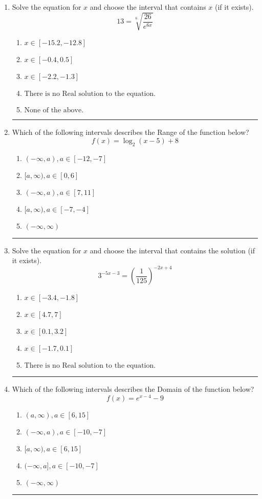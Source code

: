 \documentclass[14pt]{extbook}
\newcommand{\litem}[1]{\item#1\hspace*{-1cm}\rule{\textwidth}{0.4pt}}
\begin{document}
\begin{enumerate}
\litem{
 Solve the equation for $x$ and choose the interval that contains $x$ (if it exists).\[  13 = \sqrt[6]{\frac{26}{e^{6x}}} \]\begin{enumerate}[label=\Alph*.]
\item \( x \in [-15.2, -12.8] \)
\item \( x \in [-0.4, 0.5] \)
\item \( x \in [-2.2, -1.3] \)
\item \( \text{There is no Real solution to the equation.} \)
\item \( \text{None of the above.} \)

\end{enumerate} }
\litem{
Which of the following intervals describes the Range of the function below?\[ f(x) = \log_2{(x-5)}+8 \]\begin{enumerate}[label=\Alph*.]
\item \( (-\infty, a), a \in [-12, -7] \)
\item \( [a, \infty), a \in [0, 6] \)
\item \( (-\infty, a), a \in [7, 11] \)
\item \( [a, \infty), a \in [-7, -4] \)
\item \( (-\infty, \infty) \)

\end{enumerate} }
\litem{
Solve the equation for $x$ and choose the interval that contains the solution (if it exists).\[ 3^{-5x-3} = \left(\frac{1}{125}\right)^{-2x+4} \]\begin{enumerate}[label=\Alph*.]
\item \( x \in [-3.4, -1.8] \)
\item \( x \in [4.7, 7] \)
\item \( x \in [0.1, 3.2] \)
\item \( x \in [-1.7, 0.1] \)
\item \( \text{There is no Real solution to the equation.} \)

\end{enumerate} }
\litem{
Which of the following intervals describes the Domain of the function below?\[ f(x) = e^{x-4}-9 \]\begin{enumerate}[label=\Alph*.]
\item \( (a, \infty), a \in [6, 15] \)
\item \( (-\infty, a), a \in [-10, -7] \)
\item \( [a, \infty), a \in [6, 15] \)
\item \( (-\infty, a], a \in [-10, -7] \)
\item \( (-\infty, \infty) \)


\end{enumerate}}
\end{enumerate}
\end{document}

